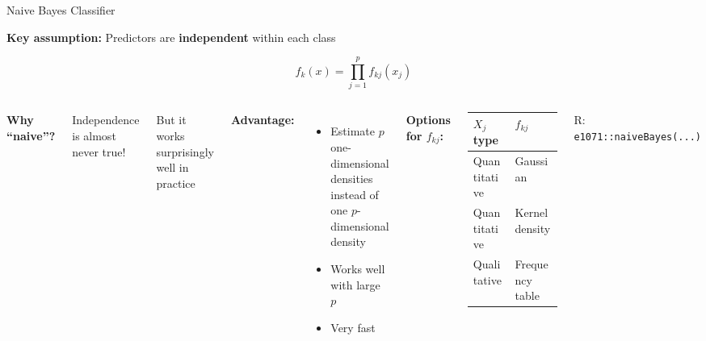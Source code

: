 \documentclass[aspectratio=169, 11pt]{beamer}
\begin{document}
\begin{frame}{Naive Bayes Classifier}

\textbf{Key assumption:} Predictors are \textbf{independent} within each class

$$f_k(x) = \prod_{j=1}^{p} f_{kj}(x_j)$$

\begin{columns}
\textbf{Why ``naive''?}

Independence is almost never true!

But it works surprisingly well in practice

\vspace{0.5em}
\textbf{Advantage:}
\begin{itemize}
  \item Estimate $p$ one-dimensional densities\\instead of one $p$-dimensional density
  \item Works well with large $p$
  \item Very fast
\end{itemize}

\textbf{Options for $f_{kj}$:}

\vspace{0.3em}
\begin{tabular}{ll}
\toprule
$X_j$ type & $f_{kj}$ \\
\midrule
Quantitative & Gaussian \\
Quantitative & Kernel density \\
Qualitative & Frequency table \\
\bottomrule
\end{tabular}

\vspace{0.5em}
R: \texttt{e1071::naiveBayes(...)}
\end{columns}
\end{frame}
\end{document}
